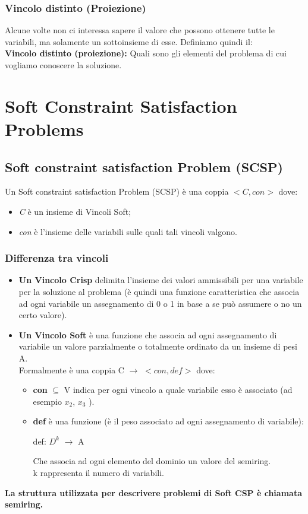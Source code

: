 \subsection{Vincolo distinto (Proiezione)}
Alcune volte non ci interessa sapere il valore che possono ottenere tutte le variabili, ma solamente un sottoinsieme di esse. Definiamo quindi il: 
\\
\textbf{Vincolo distinto (proiezione):} Quali sono gli elementi del problema di cui vogliamo conoscere la soluzione.

\chapter{Soft Constraint Satisfaction Problems} \label{ch:Soft Constraint Satisfaction Problems}
\section{Soft constraint satisfaction Problem (SCSP)}
Un Soft constraint satisfaction Problem (SCSP) è una coppia $<C, con>$ dove:
\begin{itemize}
    \item \textit{C} è un insieme di Vincoli Soft;
    \item \textit{con} è l’insieme delle variabili sulle quali tali vincoli valgono.
\end{itemize}

\subsection{Differenza tra vincoli}
\begin{itemize}
    \item \textbf{Un Vincolo Crisp} delimita l’insieme dei valori ammissibili per una variabile per la soluzione al problema (è quindi una funzione caratteristica che associa ad ogni variabile un assegnamento di 0 o 1 in base a se può assumere o no un certo valore).
    \item \textbf{Un Vincolo Soft} è una funzione che associa ad ogni assegnamento di variabile un valore parzialmente o totalmente ordinato da un insieme di pesi A.
    \\Formalmente è una coppia C $\rightarrow$ $<con, def>$ dove:
    
    \begin{itemize}
        \item \textbf{con} $\subseteq$ V indica per ogni vincolo a quale variabile esso è associato (ad esempio $x_2 $, $x_3$ ).
        \item \textbf{def} è una funzione (è il peso associato ad ogni assegnamento di variabile):
        \begin{center}
            def: $D^k$ $\rightarrow$ A

            Che associa ad ogni elemento del dominio un valore del semiring. 
            \\k rappresenta il numero di variabili.
        \end{center}
    \end{itemize}
\end{itemize}
\textbf{La struttura utilizzata per descrivere problemi di Soft CSP è chiamata semiring.}

